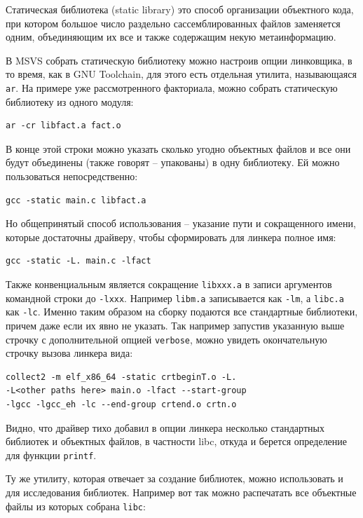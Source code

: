 \documentclass[a4paper,12pt,oneside]{article}
\begin{document}
Статическая библиотека (static library) это способ организации объектного кода, при котором большое число раздельно сассемблированных файлов заменяется одним, объединяющим их все и также содержащим некую метаинформацию.

В MSVS собрать статическую библиотеку можно настроив опции линковщика, в то время, как в GNU Toolchain, для этого есть отдельная утилита, называющаяся \lstinline!ar!. На примере уже рассмотренного факториала, можно собрать статическую библиотеку из одного модуля:

\begin{verbatim}
ar -cr libfact.a fact.o
\end{verbatim}

В конце этой строки можно указать сколько угодно объектных файлов и все они будут объединены (также говорят -- упакованы) в одну библиотеку. Ей можно пользоваться непосредственно:

\begin{verbatim}
gcc -static main.c libfact.a
\end{verbatim}

Но общепринятый способ использования -- указание пути и сокращенного имени, которые достаточны драйверу, чтобы сформировать для линкера полное имя:

\begin{verbatim}
gcc -static -L. main.c -lfact
\end{verbatim}

Также конвенциальным является сокращение \lstinline!libxxx.a! в записи аргументов командной строки до \lstinline!-lxxx!. Например \lstinline!libm.a! записывается как \lstinline!-lm!, а \lstinline!libс.a! как \lstinline!-lс!. Именно таким образом на сборку подаются все стандартные библиотеки, причем даже если их явно не указать. Так например запустив указанную выше строчку с дополнительной опцией \lstinline!verbose!, можно увидеть окончательную строчку вызова линкера вида:

\begin{verbatim}
collect2 -m elf_x86_64 -static crtbeginT.o -L. 
-L<other paths here> main.o -lfact --start-group 
-lgcc -lgcc_eh -lc --end-group crtend.o crtn.o
\end{verbatim}

Видно, что драйвер тихо добавил в опции линкера несколько стандартных библиотек и объектных файлов, в частности libc, откуда и берется определение для функции \lstinline!printf!.

Ту же утилиту, которая отвечает за создание библиотек, можно использовать и для исследования библиотек. Например вот так можно распечатать все объектные файлы из которых собрана \lstinline!libc!:
\end{document}
